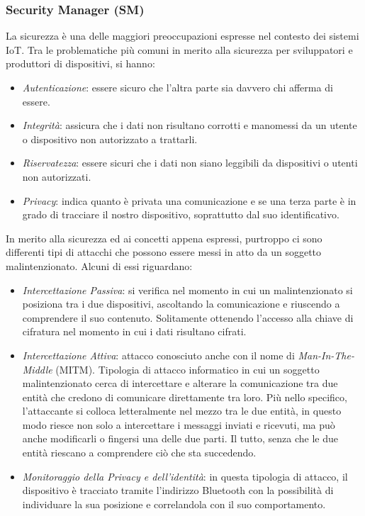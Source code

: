 \subsubsection{Security Manager (SM)}
La sicurezza è una delle maggiori preoccupazioni espresse nel contesto dei sistemi IoT. Tra le problematiche più comuni in merito alla sicurezza per sviluppatori e produttori di dispositivi, si hanno:
\begin{itemize}
    \item \textit{Autenticazione}: essere sicuro che l'altra parte sia davvero chi afferma di essere.
    \item \textit{Integrità}: assicura che i dati non risultano corrotti e manomessi da un utente o dispositivo non autorizzato a trattarli.
    \item \textit{Riservatezza}: essere sicuri che i dati non siano leggibili da dispositivi o utenti non autorizzati.
    \item \textit{Privacy}: indica quanto è privata una comunicazione e se una terza parte è in grado di tracciare il nostro dispositivo, soprattutto dal suo identificativo.
\end{itemize}
In merito alla sicurezza ed ai concetti appena espressi, purtroppo ci sono differenti tipi di attacchi che possono essere messi in atto da un soggetto malintenzionato. Alcuni di essi riguardano:
\begin{itemize}
    \item \textit{Intercettazione Passiva}: si verifica nel momento in cui un malintenzionato si posiziona tra i due dispositivi, ascoltando la comunicazione e riuscendo a comprendere il suo contenuto. Solitamente ottenendo l'accesso alla chiave di cifratura nel momento in cui i dati risultano cifrati.
    \item \textit{Intercettazione Attiva}: attacco conosciuto anche con il nome di \textit{Man-In-The-Middle} (MITM). 
    Tipologia di attacco informatico in cui un soggetto malintenzionato cerca di intercettare e alterare la comunicazione tra due entità che credono di comunicare direttamente tra loro. Più nello specifico, l’attaccante si colloca letteralmente nel mezzo tra le due entità, in questo modo riesce non solo a intercettare i messaggi inviati e ricevuti, ma può anche modificarli o fingersi una delle due parti. Il tutto, senza che le due entità riescano a comprendere ciò che sta succedendo.
    \item \textit{Monitoraggio della Privacy e dell'identità}: in questa tipologia di attacco, il dispositivo è tracciato tramite l'indirizzo Bluetooth con la possibilità di individuare la sua posizione e correlandola con il suo comportamento.
\end{itemize}

